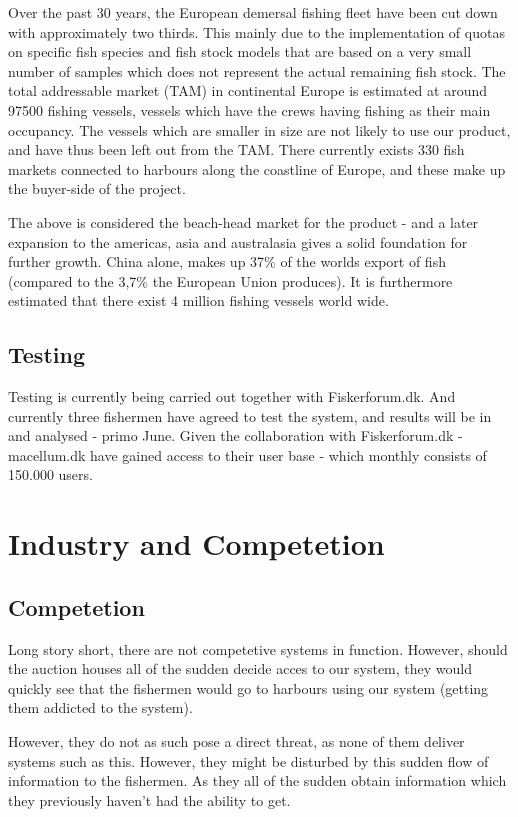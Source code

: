 \documentclass[12pt]{article}
\begin{document}
Over the past 30 years, the European demersal fishing fleet have been cut down with approximately two thirds. This mainly due to the implementation of quotas on specific fish species and fish stock models that are based on a very small number of samples which does not represent the actual remaining fish stock. The total addressable market (TAM) in continental Europe is estimated at around 97500 fishing vessels, vessels which have the crews having fishing as their main occupancy. The vessels which are smaller in size are not likely to use our product, and have thus been left out from the TAM. There currently exists 330 fish markets connected to harbours along the coastline of Europe, and these make up the buyer-side of the project. 

The above is considered the beach-head market for the product - and a later expansion to the americas, asia and australasia gives a solid foundation for further growth. China alone, makes up 37\% of the worlds export of fish (compared to the 3,7\% the European Union produces). It is furthermore estimated that there exist 4 million fishing vessels world wide. 


\subsection{Testing}
Testing is currently being carried out together with Fiskerforum.dk. And currently three fishermen have agreed to test the system, and results will be in and analysed - primo June. Given the collaboration with Fiskerforum.dk - macellum.dk have gained access to their user base - which monthly consists of 150.000 users. 

\cleardoublepage
\section{Industry and Competetion}
\subsection{Competetion}
Long story short, there are not competetive systems in function. However, should the auction houses all of the sudden decide acces to our system, they would quickly see that the fishermen would go to harbours using our system (getting them addicted to the system).

However, they do not as such pose a direct threat, as none of them deliver systems such as this. However, they might be disturbed by this sudden flow of information to the fishermen. As they all of the sudden obtain information which they previously haven't had the ability to get. 
\end{document}
